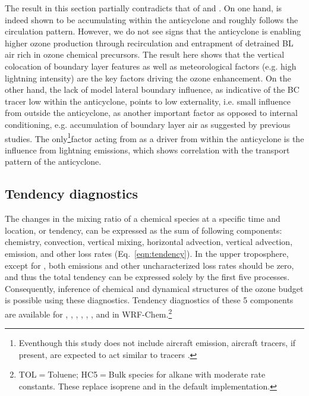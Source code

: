 The result in this section partially contradicts that of \citet{Li:2005ss} and \citet{Cooper:2007cr}. On one hand, {\lnox} is indeed shown to be
accumulating within the anticyclone and roughly follows the circulation pattern. However, we do not see signs that the anticyclone is
enabling higher ozone production through recirculation and entrapment of detrained BL air rich in ozone chemical precursors. The result here
shows that the vertical colocation of boundary layer features as well as meteorological factors (e.g. high lightning intensity) are the key factors
driving the ozone enhancement. On the other hand, the lack of model lateral boundary influence, as indicative of the BC tracer low within the
anticyclone, points to low externality, i.e. small influence from outside the anticyclone, as another important factor as opposed to internal conditioning,
e.g. accumulation of boundary layer air as suggested by previous studies. The only\footnote{Eventhough this study does not include aircraft emission,
aircraft tracers, if present, are expected to act similar to {\lnox} tracers \citep[see][]{Hudman:2007fu}.}factor acting from as a driver from within
the anticyclone is the influence from lightning emissions, which shows correlation with the transport pattern of the anticyclone.

\subsection{Tendency diagnostics}\label{ssec:2006/discuss/tendency}

The changes in the mixing ratio of a chemical species at a specific time and location, or tendency, can be expressed as
the sum of following components: chemistry, convection, vertical mixing, horizontal advection, vertical advection, emission,
and other loss rates (Eq.~\ref{eqn:tendency}). In the upper troposphere, except for , both emissions and other
uncharacterized loss rates should be zero, and thus the total tendency can be expressed solely by the first five processes.
Consequently, inference of chemical and dynamical structures of the ozone budget is possible using these diagnostics.
Tendency diagnostics of these 5 components are available for , , , , 
, , and  in WRF-Chem.\footnote{TOL$=$Toluene; HC5$=$Bulk species for alkane with moderate 
rate constants. These replace isoprene and  in the default implementation.}

